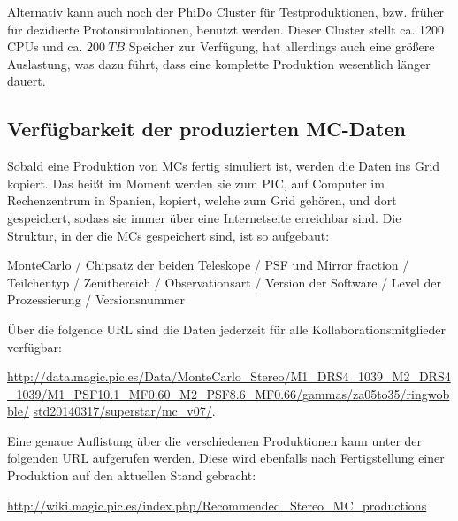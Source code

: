 Alternativ kann auch noch der PhiDo Cluster für Testproduktionen, bzw. früher für dezidierte Protonsimulationen, benutzt werden. 
Dieser Cluster stellt ca. 1200 CPUs und ca. $\SI{200}{TB}$ Speicher zur Verfügung, hat allerdings auch eine größere Auslastung, was dazu führt, dass eine komplette Produktion wesentlich länger dauert.



\subsection{Verfügbarkeit der produzierten MC-Daten}
\label{sec:Wenn die MCs fertig sind}
Sobald eine Produktion von MCs fertig simuliert ist, werden die Daten ins Grid kopiert.
Das heißt im Moment werden sie zum PIC, auf Computer im Rechenzentrum in Spanien, kopiert, welche zum Grid gehören, und dort gespeichert, sodass sie immer über eine Internetseite erreichbar sind.
Die Struktur, in der die MCs gespeichert sind, ist so aufgebaut:\newline 

MonteCarlo / Chipsatz der beiden Teleskope / PSF und Mirror fraction / Teilchentyp / Zenitbereich / Observationsart / Version der Software / Level der Prozessierung / Versionsnummer \newline

Über die folgende URL sind die Daten jederzeit für alle Kollaborationsmitglieder verfügbar:

\url{http://data.magic.pic.es/Data/MonteCarlo_Stereo/M1_DRS4_1039_M2_DRS4_1039/M1_PSF10.1_MF0.60_M2_PSF8.6_MF0.66/gammas/za05to35/ringwobble/}\newline
\url{std20140317/superstar/mc_v07/}.

Eine genaue Auflistung über die verschiedenen Produktionen kann unter der folgenden URL aufgerufen werden.
Diese wird ebenfalls nach Fertigstellung einer Produktion auf den aktuellen Stand gebracht:

\url{http://wiki.magic.pic.es/index.php/Recommended_Stereo_MC_productions}


